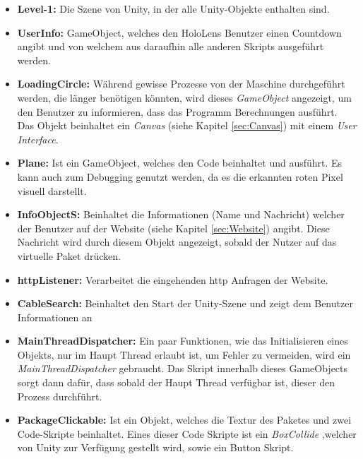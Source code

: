 \begin{itemize}
    \item \textbf{Level-1:} Die Szene von Unity, in der alle Unity-Objekte enthalten sind.
    \item \textbf{UserInfo:} GameObject, welches den HoloLens Benutzer einen Countdown angibt und von welchem aus daraufhin alle anderen Skripts ausgeführt werden.
    \item \textbf{LoadingCircle:} Während gewisse Prozesse von der Maschine durchgeführt werden, die länger benötigen könnten, wird dieses \textit{GameObject} angezeigt, um den Benutzer zu informieren, dass das Programm Berechnungen ausführt. Das Objekt beinhaltet ein \textit{Canvas} (siehe Kapitel \ref{sec:Canvas}) mit einem \textit{User Interface}.
    \item \textbf{Plane:} Ist ein GameObject, welches den Code beinhaltet und ausführt. Es kann auch zum Debugging genutzt werden, da es die erkannten roten Pixel visuell darstellt.
    \item \textbf{InfoObjectS:} Beinhaltet die Informationen (Name und Nachricht) welcher der Benutzer auf der Website (siehe Kapitel \ref{sec:Website}) angibt. Diese Nachricht wird durch diesem Objekt angezeigt, sobald der Nutzer auf das virtuelle Paket drücken.
    \item \textbf{httpListener:} Verarbeitet die eingehenden http Anfragen der Website.
    \item \textbf{CableSearch:} Beinhaltet den Start der Unity-Szene und zeigt dem Benutzer Informationen an
    \item \textbf{MainThreadDispatcher: } Ein paar Funktionen, wie das Initialisieren eines Objekts, nur im Haupt Thread erlaubt ist, um Fehler zu vermeiden, wird ein \textit{MainThreadDispatcher} gebraucht. Das Skript innerhalb dieses GameObjects sorgt dann dafür, dass sobald der Haupt Thread verfügbar ist, dieser den Prozess durchführt.
    \item \textbf{PackageClickable:} Ist ein Objekt, welches die Textur des Paketes und zwei Code-Skripte beinhaltet. Eines dieser Code Skripte ist ein \textit{BoxCollide } ,welcher von Unity zur Verfügung gestellt wird, sowie ein Button Skript.
\end{itemize}
